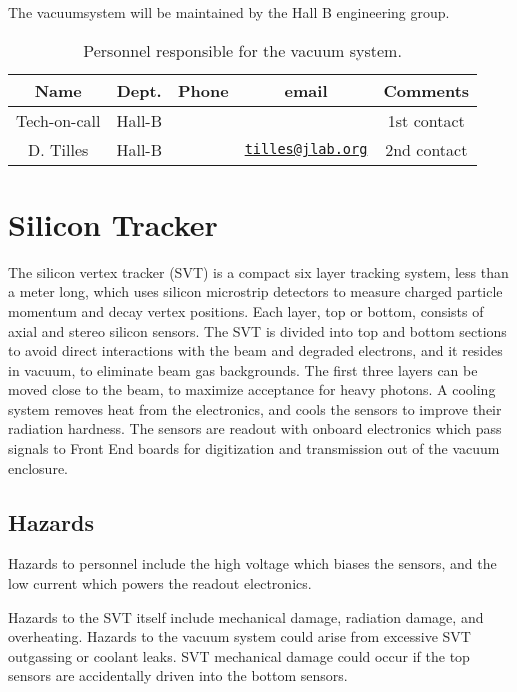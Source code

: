 \documentclass[11pt]{report}
\begin{document}
\indent

The vacuumsystem will be maintained by the Hall B engineering group.  

 \begin{table}[!htb]
 \centering
 \begin{tabular}{|c|c|c|c|c|}
\hline
 Name&Dept.&Phone&email&Comments \\ \hline
 Tech-on-call & Hall-B&&& 1st contact  \\ \hline
 D. Tilles & Hall-B&&\href{mailto:tilles@jlab.org}{\nolinkurl{tilles@jlab.org}}&2nd contact \\ \hline
 \end{tabular}
\caption{Personnel responsible for the vacuum system.} 
\label{tb:vacuum}
\end{table}


\section{Silicon Tracker}
\indent

The silicon vertex tracker (SVT) is a compact six layer tracking system, less than a meter long, which uses silicon microstrip detectors to measure charged particle momentum and decay vertex positions. Each layer, top or bottom, consists of axial and stereo silicon sensors. The SVT  is divided into top and bottom sections  to avoid direct interactions with the beam and degraded electrons, and it resides in vacuum, to eliminate beam gas backgrounds. The first three layers can be moved close to the beam, to maximize acceptance for heavy photons. A cooling system removes heat from the electronics, and cools the sensors to improve their radiation hardness.  The sensors are readout with onboard electronics which pass signals to Front End boards for digitization and transmission out of the vacuum enclosure.

\subsection{Hazards} 
\indent

Hazards to personnel include the high voltage which biases the sensors, and the low current which powers the readout electronics.

Hazards to the SVT itself include mechanical damage, radiation damage, and overheating. Hazards to the vacuum system could arise from excessive SVT outgassing or coolant leaks.
SVT mechanical damage could occur if the top sensors are accidentally driven into the bottom sensors.
\end{document}
